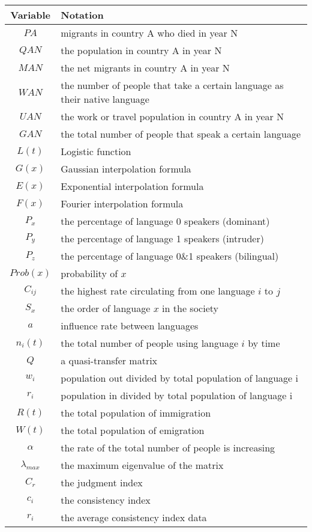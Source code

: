 \documentclass{mcmthesis}
\begin{document}
\begin{tabular}{c|l}
Variable & Notation \\
\hline $PA$ & migrants in country A who died in year N \\
\hline $QAN$ & the population in country A in year N \\
\hline $MAN$ & the net migrants in country A in year N \\
\hline $WAN$ & the number of people that take a certain language as their native language \\
\hline $UAN$ & the work or travel population in country A in year N \\
\hline $GAN$ & the total number of people that speak a certain language \\
\hline $L(t)$ & Logistic function \\
\hline $G(x)$ & Gaussian interpolation formula \\
\hline $E(x)$ & Exponential interpolation formula \\
\hline $F(x)$ & Fourier interpolation formula \\
\hline $P_x$ & the percentage of language 0 speakers (dominant) \\
\hline $P_y$ & the percentage of language 1 speakers (intruder) \\
\hline $P_z$ & the percentage of language 0\&1 speakers (bilingual) \\
\hline $Prob(x)$ & probability of $x$ \\
\hline $C_{ij}$ & the highest rate circulating from one language $i$ to $j$ \\
\hline $S_x$ & the order of language $x$ in the society \\
\hline $a$ & influence rate between languages \\
\hline $n_i(t)$ & the total number of people using language $i$ by time \\
\hline $Q$ & a quasi-transfer matrix \\
\hline $w_i$ & population out divided by total population of language i \\
\hline $r_i$ & population in divided by total population of language i \\
\hline $R(t)$ & the total population of immigration \\
\hline $W(t)$ & the total population of emigration \\
\hline $\alpha$ & the rate of the total number of people is increasing \\
\hline $\lambda_{max}$ & the maximum eigenvalue of the matrix \\
\hline $C_r$ & the judgment index \\
\hline $c_i$ & the consistency index \\
\hline $r_i$ & the average consistency index data \\
\end{tabular} \\
\end{document}
